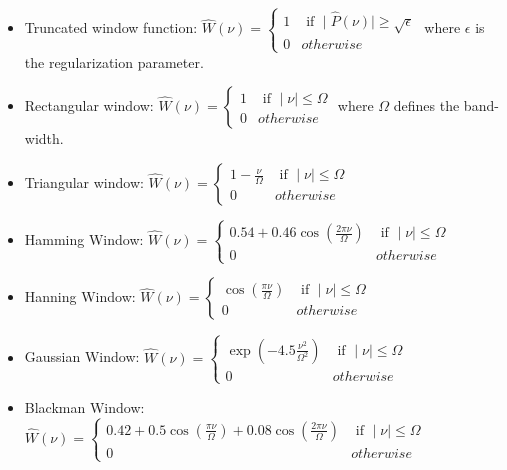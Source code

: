 \documentclass[11pt,a4paper]{article}
\begin{document}
\begin{itemize}
\item Truncated window function:
$
\hat{W}(\nu) =  \left\{
  \begin{array}{ll}
    1   &  \mbox{ if }  \mid \hat{P}(\nu) \mid \ge \sqrt{\epsilon}    \\
    0   &   otherwise
  \end{array}
  \right.
$
where $\epsilon$ is the regularization parameter.
\item Rectangular window:
$
\hat{W}(\nu) =  \left\{
  \begin{array}{ll}
    1   &  \mbox{ if }  \mid  \nu \mid \le \Omega    \\
    0   &   otherwise
  \end{array}
  \right.
$
where $\Omega$ defines the band-width.
\item Triangular window:
$
\hat{W}(\nu) =  \left\{
  \begin{array}{ll}
    1 - \frac{\nu}{\Omega}  &  \mbox{ if }  \mid  \nu \mid \le \Omega    \\
    0   &   otherwise
  \end{array}
  \right.
$
\item Hamming Window:
$
\hat{W}(\nu) =  \left\{
  \begin{array}{ll}
    0.54 + 0.46 \cos(\frac{2\pi \nu}{\Omega})    &  \mbox{ if }  \mid  \nu \mid \le \Omega    \\
    0   &   otherwise
  \end{array}
  \right.
$

\item Hanning Window:
$
\hat{W}(\nu) =  \left\{
  \begin{array}{ll}
    \cos(\frac{\pi \nu}{\Omega})    &  \mbox{ if }  \mid  \nu \mid \le \Omega    \\
    0   &   otherwise
  \end{array}
  \right.
$

\item Gaussian Window:
$
\hat{W}(\nu) =  \left\{
  \begin{array}{ll}
     \exp(-4.5 \frac{\nu^2}{\Omega^2})    &  \mbox{ if }  \mid  \nu \mid \le \Omega    \\
    0   &   otherwise
  \end{array}
  \right.
$

\item Blackman Window:
$
\hat{W}(\nu) =  \left\{
  \begin{array}{ll}
  0.42 + 0.5  \cos(\frac{\pi \nu}{\Omega}) +  0.08  \cos(\frac{2\pi \nu}{\Omega})  &  \mbox{ if }  \mid  \nu \mid \le \Omega    \\
    0   &   otherwise
  \end{array}
  \right.
$

\end{itemize}
\end{document}
